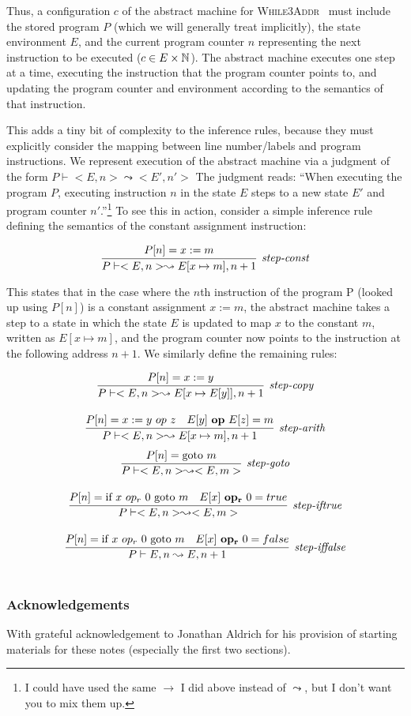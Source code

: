 \documentclass[11pt]{article}
\def\Natural{\mathbb{N}}
\def\WhileThAddr{\textsc{While3Addr}}
\begin{document}
Thus, a configuration $c$ of the abstract machine for \WhileThAddr~
must include the stored program $P$ (which we will generally treat implicitly),
the state environment $E$, and the current program counter $n$
representing the next instruction to be executed ($c \in E \cross \Natural$). 
The abstract machine executes one step at a time, executing the instruction that
the program counter points to, and updating the program counter and environment
according to the semantics of that instruction.  

This adds a tiny bit of complexity to the inference rules, because
they must explicitly consider the mapping between line number/labels and program
instructions.  We represent execution of
the abstract machine via a judgment of the form $P \vdash <E,n>
\leadsto <E',n'>$ The judgment reads: ``When executing the program $P$,
executing instruction $n$ in the state $E$ steps to a new state $E'$
and program counter $n'$.''\footnote{I could have used the same $\rightarrow$ I
  did above instead of $\leadsto$, but I don't want you to mix them up.}
To see this in action, consider a simple inference rule defining the semantics of the constant
 assignment instruction:

\[
\infer[\textit{step-const}]{P \vdash <E,n> \leadsto E[x \mapsto m],n+1}{P[n] = x := m}
\]

This states that in the case where the $n$th instruction of the program P (looked up using $P[n]$) is a constant assignment $x := m$, the abstract machine takes a step to a state in which the state $E$ is updated to map $x$ to the constant $m$, written as $E[x \mapsto m]$, and the program counter now points to the instruction at the following address $n+1$.
%
We similarly define the remaining rules:

\[
\begin{array}{c}
\infer[\textit{step-copy}]
	{P \vdash <E,n> \leadsto E[x \mapsto E[y]],n+1}
	{P[n] = x := y}\\[3ex]
	\infer[\textit{step-arith}]
	{P \vdash <E, n> \leadsto E[x \mapsto m],n+1}
	{P[n] = x := y ~op~ z & E[y] ~\mathbf{op}~ E[z] = m}\\
\end{array}
\]
\[
\begin{array}{c}	

\infer[\textit{step-goto}]
	{P \vdash <E,n> \leadsto <E,m>}
	{P[n] = \mbox{goto}~m}\\[3ex]
	
\infer[\textit{step-iftrue}]
	{P \vdash <E,n> \leadsto <E,m>}
	{P[n] = \mbox{if}~x~op_r~0~\mbox{goto}~m & E[x] ~\mathbf{op_r}~ 0 = true}\\[3ex]
	
\infer[\textit{step-iffalse}]
	{P \vdash E,n \leadsto E,n+1}
	{P[n] = \mbox{if}~x~op_r~0~\mbox{goto}~m & E[x] ~\mathbf{op_r}~ 0 = false}\\[3ex]
	
\end{array}
\]


\subsubsection*{Acknowledgements}

With grateful acknowledgement to Jonathan Aldrich for his provision of starting
materials for these notes (especially the first two sections). 
\end{document}
